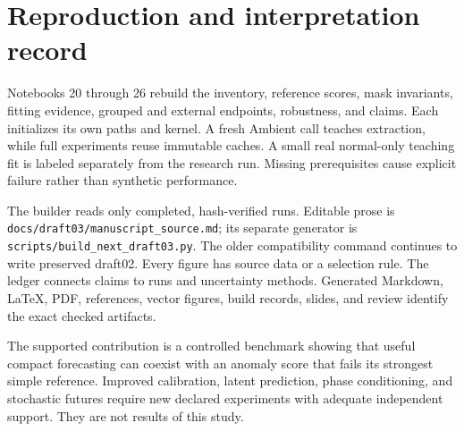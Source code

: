 \documentclass[letterpaper]{article}
\begin{document}
\section{Reproduction and interpretation record}

Notebooks 20 through 26 rebuild the inventory, reference scores, mask invariants, fitting evidence, grouped and external endpoints, robustness, and claims. Each initializes its own paths and kernel. A fresh Ambient call teaches extraction, while full experiments reuse immutable caches. A small real normal-only teaching fit is labeled separately from the research run. Missing prerequisites cause explicit failure rather than synthetic performance.

The builder reads only completed, hash-verified runs. Editable prose is \texttt{docs/draft03/manuscript\_source.md}; its separate generator is \texttt{scripts/build\_next\_draft03.py}. The older compatibility command continues to write preserved draft02. Every figure has source data or a selection rule. The ledger connects claims to runs and uncertainty methods. Generated Markdown, LaTeX, PDF, references, vector figures, build records, slides, and review identify the exact checked artifacts.

The supported contribution is a controlled benchmark showing that useful compact forecasting can coexist with an anomaly score that fails its strongest simple reference. Improved calibration, latent prediction, phase conditioning, and stochastic futures require new declared experiments with adequate independent support. They are not results of this study.
\end{document}
